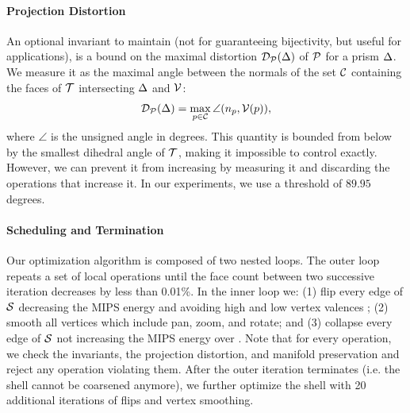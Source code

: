 

\paragraph{Projection Distortion} 
An optional invariant to maintain (not  for guaranteeing bijectivity, but useful for applications), 
is a bound  on the maximal distortion $\D_\P(\Prism) $ of $\P$ for a prism $\Prism$. 
We measure it as  the maximal angle between the normals of the set $\C$ containing the faces of $\T$ intersecting $\Prism$ and $\V$:
\begin{equation*}
    \D_\P(\Prism) = \max_{p \in \C} \angle (n_p, \V(p)),
\end{equation*}
where $\angle$ is the unsigned angle in degrees. This quantity is bounded from below by the smallest dihedral angle of $\T$, making it impossible to control exactly. However, we can prevent it from increasing by measuring it and discarding the operations that increase it. In our experiments, we use a threshold of $89.95$ degrees.

\paragraph{Scheduling and Termination}
Our optimization algorithm is composed of two nested loops. The outer loop repeats a set of local operations until the face count between two successive iteration decreases by less than 0.01\%. In the inner loop we: (1) flip every edge of $\S$ decreasing  the MIPS energy and avoiding high and low vertex valences \cite{dunyach2013adaptive}; (2) smooth all vertices which include pan, zoom, and rotate; and (3) collapse every edge of $\S$ not increasing the MIPS energy over . Note that for every operation, we check the invariants, the projection distortion, and manifold preservation and reject any operation violating them.
%
After the outer iteration terminates (i.e.  the shell cannot be coarsened anymore), we further optimize the shell with 20 additional iterations of flips and vertex smoothing.




